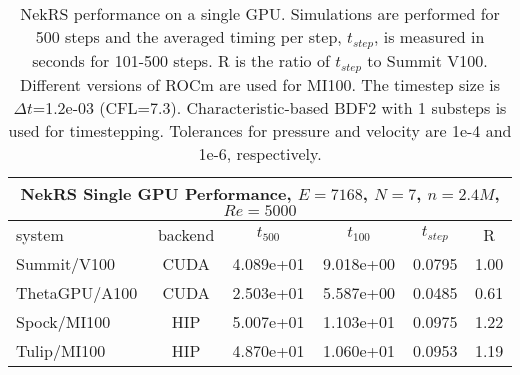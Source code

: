  \begin{table*}[!h]
  \footnotesize
  \begin{center}
  \begin{tabular}{|l|c|c|c|c|c|}
  \hline
  \multicolumn{6}{|c|}{{\bf NekRS Single GPU Performance, $E=7168$, $N=7$, $n=2.4M$, $Re=5000$}} \\
  \hline
   system   &  backend &  $t_{500}$     &   $t_{100}$    &   $t_{step}$ & R \\
  \hline
    Summit/V100   &  CUDA   &    4.089e+01  &  9.018e+00 &  0.0795 & 1.00   \\
    ThetaGPU/A100 &  CUDA   &    2.503e+01  &  5.587e+00 &  0.0485 & 0.61   \\
    Spock/MI100   &  HIP    &    5.007e+01  &  1.103e+01 &  0.0975 & 1.22   \\
    Tulip/MI100   &  HIP    &    4.870e+01  &  1.060e+01 &  0.0953 & 1.19   \\
  \hline
  \end{tabular}
  \end{center}
  \caption{\label{tb:singlerod} NekRS performance on a single GPU.
   Simulations are performed for 500 steps and the averaged timing per step, $t_{step}$,
   is measured in seconds for 101-500 steps. R is the ratio of $t_{step}$ to Summit V100.
   Different versions of ROCm are used for MI100.
   The timestep size is $\Delta t$=1.2e-03 (CFL=7.3).
   Characteristic-based BDF2 with 1 substeps is used for timestepping.
   Tolerances for pressure and velocity are  1e-4 and 1e-6, respectively.}
 \end{table*}

